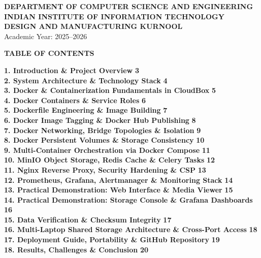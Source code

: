 \documentclass[11pt,a4paper]{report}
\begin{document}
\begin{titlepage}
\begin{center}
        \vfill
        {\large\bfseries\color{iiitblue} DEPARTMENT OF COMPUTER SCIENCE AND ENGINEERING}\\[0.15cm]
        {\large\bfseries INDIAN INSTITUTE OF INFORMATION TECHNOLOGY}\\[0.1cm]
        {\large\bfseries DESIGN AND MANUFACTURING KURNOOL}\\[0.2cm]
        {\normalsize Academic Year: 2025--2026}
    \end{center}
\end{titlepage}

\thispagestyle{plain}
\begin{center}
    {\Large\bfseries\color{iiitblue} TABLE OF CONTENTS}
\end{center}
\vspace*{-0.25cm}

\noindent\textbf{1. Introduction \& Project Overview} \dotfill \textbf{3}\\
\textbf{2. System Architecture \& Technology Stack} \dotfill \textbf{4}\\
\textbf{3. Docker \& Containerization Fundamentals in CloudBox} \dotfill \textbf{5}\\
\textbf{4. Docker Containers \& Service Roles} \dotfill \textbf{6}\\
\textbf{5. Dockerfile Engineering \& Image Building} \dotfill \textbf{7}\\
\textbf{6. Docker Image Tagging \& Docker Hub Publishing} \dotfill \textbf{8}\\
\textbf{7. Docker Networking, Bridge Topologies \& Isolation} \dotfill \textbf{9}\\
\textbf{8. Docker Persistent Volumes \& Storage Consistency} \dotfill \textbf{10}\\
\textbf{9. Multi-Container Orchestration via Docker Compose} \dotfill \textbf{11}\\
\textbf{10. MinIO Object Storage, Redis Cache \& Celery Tasks} \dotfill \textbf{12}\\
\textbf{11. Nginx Reverse Proxy, Security Hardening \& CSP} \dotfill \textbf{13}\\
\textbf{12. Prometheus, Grafana, Alertmanager \& Monitoring Stack} \dotfill \textbf{14}\\
\textbf{13. Practical Demonstration: Web Interface \& Media Viewer} \dotfill \textbf{15}\\
\textbf{14. Practical Demonstration: Storage Console \& Grafana Dashboards} \dotfill \textbf{16}\\
\textbf{15. Data Verification \& Checksum Integrity} \dotfill \textbf{17}\\
\textbf{16. Multi-Laptop Shared Storage Architecture \& Cross-Port Access} \dotfill \textbf{18}\\
\textbf{17. Deployment Guide, Portability \& GitHub Repository} \dotfill \textbf{19}\\
\textbf{18. Results, Challenges \& Conclusion} \dotfill \textbf{20}
\end{document}
